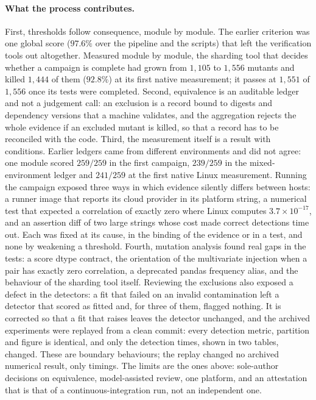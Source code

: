 \documentclass[conference]{IEEEtran}
\begin{document}
\paragraph{What the process contributes.}
First, thresholds follow consequence, module by module. The earlier criterion was one global score ($97.6\%$ over the pipeline and the scripts) that left the verification tools out altogether.
Measured module by module, the sharding tool that decides whether a campaign is complete had grown from $1{,}105$ to $1{,}556$ mutants and killed
$1{,}444$ of them ($92.8\%$) at its first native measurement; it passes at $1{,}551$ of $1{,}556$ once its tests were completed. Second, equivalence is an auditable
ledger and not a judgement call: an exclusion is a record bound to digests and dependency versions that a machine
validates, and the aggregation rejects the whole evidence if an excluded mutant is killed, so that a record has to be reconciled with the code. Third, the measurement itself is a result with
conditions. Earlier ledgers came from different environments and did not agree: one module scored $259/259$ in the
first campaign, $239/259$ in the mixed-environment ledger and $241/259$ at the first native Linux measurement. Running the campaign exposed three ways in which
evidence silently differs between hosts: a runner image that reports its cloud provider in its platform string, a
numerical test that expected a correlation of exactly zero where Linux computes $3.7\times10^{-17}$, and an assertion
diff of two large strings whose cost made correct detections time out. Each was fixed at its cause, in the binding
of the evidence or in a test, and none by weakening a threshold. Fourth, mutation analysis found real gaps in the
tests: a score dtype contract, the orientation of the multivariate injection when a pair has exactly zero
correlation, a deprecated pandas frequency alias, and the behaviour of the sharding tool itself. Reviewing the exclusions also exposed a defect in the detectors: a fit that failed on an invalid
contamination left a detector that scored as fitted and, for three of them, flagged nothing. It is corrected so that a fit that raises leaves the detector unchanged, and the archived
experiments were replayed from a clean commit: every detection metric, partition and figure is identical, and only the detection times, shown in two tables, changed. These are boundary
behaviours; the replay changed no archived numerical result, only timings.
The limits are the ones above: sole-author decisions on equivalence, model-assisted review, one platform, and an attestation that is that of a continuous-integration run, not an independent one.
\end{document}
